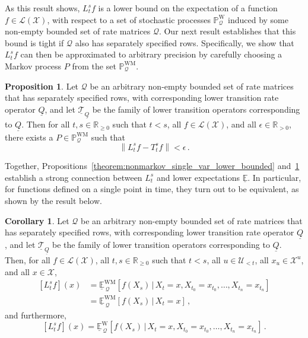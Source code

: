 \documentclass[10pt]{paper}
\theoremstyle{definition}
\newtheorem{proposition}[theorem]{Proposition}
\newtheorem{corollary}[theorem]{Corollary}
\newcommand{\reals}{\mathbb{R}}
\newcommand{\realspos}{\reals_{>0}}
\newcommand{\realsnonneg}{\reals_{\geq 0}}
\newcommand{\states}{\mathcal{X}}
\newcommand{\processes}{\mathbb{P}}
\newcommand{\mprocesses}{\processes^{\mathrm{M}}}
\newcommand{\wprocesses}{\processes^{\mathrm{W}}}
\newcommand{\wmprocesses}{\processes^{\mathrm{WM}}}
\newcommand{\lbound}{L}
\newcommand{\gambles}{\mathcal{L}}
\newcommand{\gamblesX}{\gambles(\states)}
\newcommand{\rateset}{\mathcal{Q}}
\newcommand{\lrate}{\underline{Q}}
\newcommand{\norm}[1]{\left\lVert #1 \right\rVert}
\begin{document}
As this result shows, $L_t^sf$ is a lower bound on the expectation of a function $f\in\gamblesX$, with respect to a set of stochastic processes $\wprocesses_\rateset$ induced by some non-empty bounded set of rate matrices $\rateset$. Our next result establishes that this bound is tight if $\rateset$ also has separately specified rows. Specifically, we show that $L_t^sf$ can then be approximated to arbitrary precision by carefully choosing a Markov process $P$ from the set $\wmprocesses_\rateset$.

\begin{proposition}\label{theorem:lower_markov_bound_is_tight}
Let $\rateset$ be an arbitrary non-empty bounded set of rate matrices that has separately specified rows, with corresponding lower transition rate operator $\lrate$, and let $\underline{\mathcal{T}}_{\lrate}$ be the family of lower transition operators corresponding to $\lrate$. Then for all $t,s\in\realsnonneg$ such that $t<s$, all $f\in\gamblesX$, and all $\epsilon\in\realspos$, there exists a $P\in\wmprocesses_{\rateset}$ such that
\begin{equation*}
\norm{\lbound_t^sf-T_t^sf} < \epsilon\,.
\end{equation*}
\end{proposition}

Together, Propositions~\ref{theorem:nonmarkov_single_var_lower_bounded} and~\ref{theorem:lower_markov_bound_is_tight} establish a strong connection between $L_t^s$ and lower expectations $\underline{\mathbb{E}}$. In particular, for functions defined on a single point in time, they turn out to be equivalent, as shown by the result below.

\begin{corollary}\label{cor:lower_operator_is_infimum}
Let $\rateset$ be an arbitrary non-empty bounded set of rate matrices that has separately specified rows, with corresponding lower transition rate operator $\lrate$, and let $\underline{\mathcal{T}}_{\lrate}$ be the family of lower transition operators corresponding to $\lrate$. Then, for all $f\in\gamblesX$, all $t,s\in\realsnonneg$ such that $t<s$, all $u\in\mathcal{U}_{<t}$, all $x_u\in\states^u$, and all $x\in\states$,
\begin{align*}
\left[L_t^sf\right](x) &= \underline{\mathbb{E}}^{\mathrm{WM}}_{\,\rateset}[f(X_s)\,\vert\,X_t=x,X_{t_0}=x_{t_0},\ldots,X_{t_n}=x_{t_n}] \\
 &= \underline{\mathbb{E}}^{\mathrm{WM}}_{\,\rateset}[f(X_s)\,\vert\,X_t=x]\,,%
\end{align*}
and furthermore,
\begin{equation*}
\left[L_t^sf\right](x) = \underline{\mathbb{E}}^{\mathrm{W}}_{\,\rateset}[f(X_s)\,\vert\,X_t=x,X_{t_0}=x_{t_0},\ldots,X_{t_n}=x_{t_n}]\,.%
\end{equation*}
\end{corollary}
\end{document}
